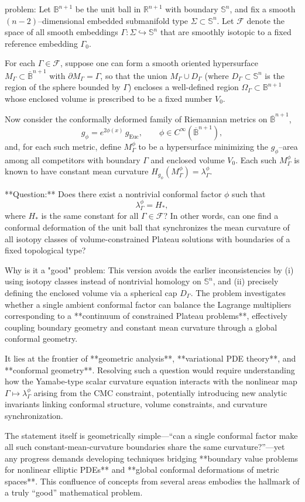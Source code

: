 problem:  
Let $\mathbb{B}^{n+1}$ be the unit ball in $\mathbb{R}^{n+1}$ with boundary $\mathbb{S}^n$, and fix a smooth $(n-2)$–dimensional embedded submanifold type $\Sigma \subset \mathbb{S}^n$.  
Let $\mathcal{F}$ denote the space of all smooth embeddings $\Gamma : \Sigma \hookrightarrow \mathbb{S}^n$ that are smoothly isotopic to a fixed reference embedding $\Gamma_0$.  

For each $\Gamma \in \mathcal{F}$, suppose one can form a smooth oriented hypersurface $M_\Gamma \subset \overline{\mathbb{B}}^{n+1}$ with $\partial M_\Gamma = \Gamma$, so that the union $M_\Gamma \cup D_\Gamma$ (where $D_\Gamma \subset \mathbb{S}^n$ is the region of the sphere bounded by $\Gamma$) encloses a well-defined region $\Omega_\Gamma \subset \mathbb{B}^{n+1}$ whose enclosed volume is prescribed to be a fixed number $V_0$.  

Now consider the conformally deformed family of Riemannian metrics on $\overline{\mathbb{B}}^{n+1}$,  
\[
g_\phi = e^{2 \phi(x)}\, g_{\mathrm{Euc}}, \qquad \phi \in C^\infty(\overline{\mathbb{B}}^{n+1}),
\]  
and, for each such metric, define $M_\Gamma^{\phi}$ to be a hypersurface minimizing the $g_\phi$–area among all competitors with boundary $\Gamma$ and enclosed volume $V_0$.  
Each such $M_\Gamma^{\phi}$ is known to have constant mean curvature $H_{g_\phi}(M_\Gamma^{\phi}) = \lambda_\Gamma^{\phi}$.  

**Question:**  
Does there exist a nontrivial conformal factor $\phi$ such that  
\[
\lambda_\Gamma^{\phi} = H_*,
\]
where $H_*$ is the same constant for all $\Gamma \in \mathcal{F}$?  
In other words, can one find a conformal deformation of the unit ball that synchronizes the mean curvature of all isotopy classes of volume-constrained Plateau solutions with boundaries of a fixed topological type?

Why is it a "good" problem:  
This version avoids the earlier inconsistencies by (i) using isotopy classes instead of nontrivial homology on $\mathbb{S}^n$, and (ii) precisely defining the enclosed volume via a spherical cap $D_\Gamma$. The problem investigates whether a single ambient conformal factor can balance the Lagrange multipliers corresponding to a **continuum of constrained Plateau problems**, effectively coupling boundary geometry and constant mean curvature through a global conformal geometry.  

It lies at the frontier of **geometric analysis**, **variational PDE theory**, and **conformal geometry**. Resolving such a question would require understanding how the Yamabe-type scalar curvature equation interacts with the nonlinear map $\Gamma \mapsto \lambda_\Gamma^\phi$ arising from the CMC constraint, potentially introducing new analytic invariants linking conformal structure, volume constraints, and curvature synchronization.  

The statement itself is geometrically simple—“can a single conformal factor make all such constant-mean-curvature boundaries share the same curvature?”—yet any progress demands developing techniques bridging **boundary value problems for nonlinear elliptic PDEs** and **global conformal deformations of metric spaces**. This confluence of concepts from several areas embodies the hallmark of a truly “good” mathematical problem.